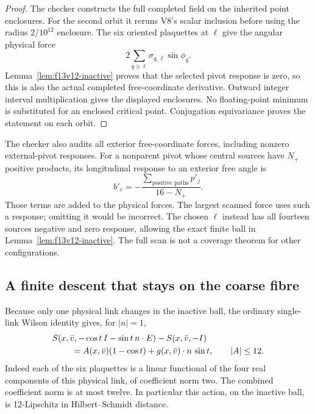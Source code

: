 \documentclass[11pt,oneside]{article}
\begin{document}
\begin{proof}
The checker constructs the full completed field
on the inherited point enclosures. For the second
orbit it reruns V8's scalar inclusion before using
the radius \(2/10^{12}\) enclosure. The six oriented
plaquettes at \(\ell\) give the angular physical force
\[
        2\sum_{q\ni\ell}\sigma_{q,\ell}\sin\phi_q .
\]
Lemma~\ref{lem:f13v12-inactive} proves that the
selected pivot response is zero, so this is also
the actual completed free-coordinate derivative.
Outward integer interval multiplication gives
the displayed enclosures. No floating-point
minimum is substituted for an enclosed critical
point. Conjugation equivariance proves the
statement on each orbit.
\end{proof}

The checker also audits all exterior free-coordinate
forces, including nonzero external-pivot responses.
For a nonparent pivot whose central sources have
\(N_+\) positive products, its longitudinal response
to an exterior free angle is
\[
 b'_e=-\frac{\sum_{\text{positive paths}}p'_j}{16-N_+}.
\]
Those terms are added to the physical forces.
The largest scanned force uses such a response;
omitting it would be incorrect. The chosen
\(\ell\) instead has all fourteen sources negative
and zero response, allowing the exact finite ball
in Lemma~\ref{lem:f13v12-inactive}. The full scan
is not a coverage theorem for other configurations.

\subsection{A finite descent that stays on the coarse fibre}

Because only one physical link changes in the
inactive ball, the ordinary single-link Wilson
identity gives, for \(|n|=1\),
\begin{equation}\label{eq:f13v12-orbit-action}
\begin{split}
 &S(x,\bar v,-\cos t\,I-\sin t\,n\cdot E)
       -S(x,\bar v,-I)\\
 &\hspace{8mm}=A(x,\bar v)(1-\cos t)
                +g(x,\bar v)\cdot n\,\sin t,\qquad |A|\le12 .
\end{split}
\end{equation}
Indeed each of the six plaquettes is a linear
functional of the four real components of this
physical link, of coefficient norm two.
The combined coefficient norm is at most twelve.
In particular this action, on the inactive ball,
is 12-Lipschitz in Hilbert--Schmidt distance.
\end{document}
